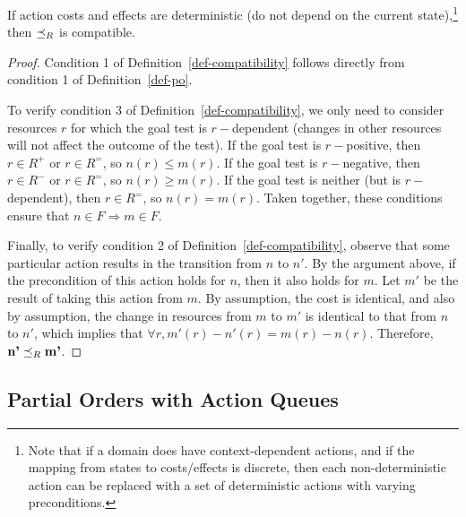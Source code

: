 \documentclass[letterpaper]{article}
\theoremstyle{plain} \newtheorem{theorem}{Theorem} \newtheorem{proposition}{Proposition} \newtheorem{lemma}{Lemma}
\theoremstyle{definition} \newtheorem{definition}{Definition} \newtheorem{conjecture}{Conjecture} \newtheorem*{example}{Example}
\theoremstyle{remark} \newtheorem*{remark}{Remark} \newtheorem*{note}{Note} \newtheorem{case}{Case}
\begin{document}
\begin{claim}{}{\label{clm-po-compatible}}
	If action costs and effects are deterministic (do not depend on the current state),\footnote{Note that if a domain does have context-dependent actions, and if the mapping from states to costs/effects is discrete, then each non-deterministic action can be replaced with a set of deterministic actions with varying preconditions.} then $\preceq_R$ is compatible.
\end{claim}
\begin{proof}
	Condition 1 of Definition~\ref{def-compatibility} follows directly from condition 1 of Definition~\ref{def-po}.
	
	To verify condition 3 of Definition~\ref{def-compatibility}, we only need to consider resources $r$ for which the goal test is $r-$dependent (changes in other resources will not affect the outcome of the test). If the goal test is $r-$positive, then $r \in R^+$ or $r \in R^=$, so $n(r) \le m(r)$. If the goal test is $r-$negative, then $r \in R^-$ or $r \in R^=$, so $n(r) \ge m(r)$. If the goal test is neither (but is $r-$dependent), then $r \in R^=$, so $n(r) = m(r)$. Taken together, these conditions ensure that $n \in F \Rightarrow m \in F$.
	
	Finally, to verify condition 2 of Definition~\ref{def-compatibility}, observe that some particular action results in the transition from $n$ to $n'$. By the argument above, if the precondition of this action holds for $n$, then it also holds for $m$. Let $m'$ be the result of taking this action from $m$. By assumption, the cost is identical, and also by assumption, the change in resources from $m$ to $m'$ is identical to that from $n$ to $n'$, which implies that $\forall r, m'(r) - n'(r) = m(r) - n(r)$. Therefore, $\textbf{n'} \preceq_R \textbf{m'}$.
\end{proof}

\subsection{Partial Orders with Action Queues}

\newcommand{\poq}{\preceq_Q}
\end{document}
